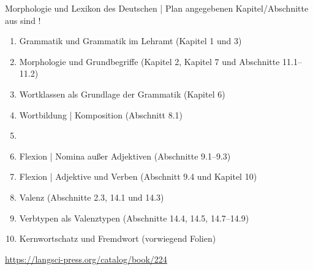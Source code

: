 \begin{frame}
  {Morphologie und Lexikon des Deutschen | Plan}
   angegebenen Kapitel\slash Abschnitte aus  sind !\\
  \Halbzeile
  \begin{enumerate}
    \item Grammatik und Grammatik im Lehramt (Kapitel 1 und 3)
    \item Morphologie und Grundbegriffe (Kapitel 2, Kapitel 7 und Abschnitte 11.1--11.2)
    \item Wortklassen als Grundlage der Grammatik (Kapitel 6)
    \item Wortbildung | Komposition (Abschnitt 8.1)
    \item {}
    \item Flexion | Nomina außer Adjektiven (Abschnitte 9.1--9.3)
    \item Flexion | Adjektive und Verben (Abschnitt 9.4 und Kapitel 10)
    \item Valenz (Abschnitte 2.3, 14.1 und 14.3)
    \item Verbtypen als Valenztypen (Abschnitte 14.4, 14.5, 14.7--14.9) 
    \item Kernwortschatz und Fremdwort (vorwiegend Folien)
  \end{enumerate}
  \Halbzeile
  \centering 
  \url{https://langsci-press.org/catalog/book/224}
\end{frame}


